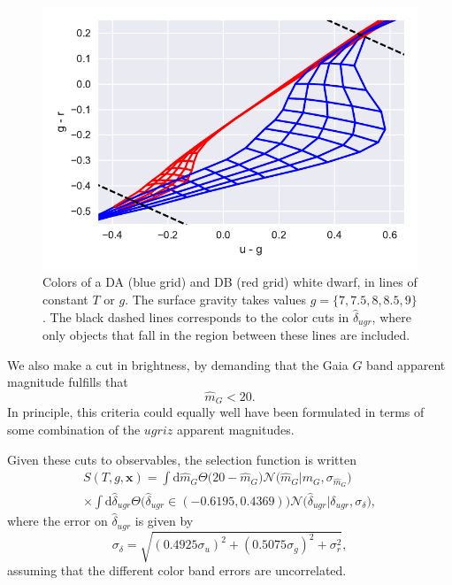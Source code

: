 \documentclass[fleqn,usenatbib]{mnras}
\newcommand{\Teff}{T}
\newcommand{\logg}{g}
\newcommand{\de}{\text{d}}
\begin{document}
\begin{figure}
	\includegraphics[width=\columnwidth]{colors_cut.pdf}
    \caption{Colors of a DA (blue grid) and DB (red grid) white dwarf, in lines of constant $\Teff$ or $\logg$. The surface gravity takes values $\logg = \{7,7.5,8,8.5,9\}$. The black dashed lines corresponds to the color cuts in $\hat{\delta}_{ugr}$, where only objects that fall in the region between these lines are included.}
    \label{fig:colors_cut}
\end{figure}

We also make a cut in brightness, by demanding that the Gaia $G$ band apparent magnitude fulfills that
\begin{equation}
	\hat{m}_G < 20.
\end{equation}
In principle, this criteria could equally well have been formulated in terms of some combination of the $ugriz$ apparent magnitudes.

Given these cuts to observables, the selection function is written
\begin{equation}\label{eq:selection}
\begin{split}
	S(\Teff,\logg,\mathbf{x}) = 
    	      \int \de \hat{m}_G \Theta \big( 20-\hat{m}_G \big)\mathcal{N}\big( \hat{m}_G | m_G,\sigma_{\hat{m}_G} \big) \\
    \times \int \de \hat{\delta}_{ugr} \Theta \big( \hat{\delta}_{ugr} \in (-0.6195,0.4369) \big) \mathcal{N}\big( \hat{\delta}_{ugr} | \delta_{ugr},\sigma_{\delta}\big),
\end{split}
\end{equation}
where the error on $\hat{\delta}_{ugr}$ is given by
\begin{equation}
	\sigma_\delta = \sqrt{ (0.4925 \sigma_u)^2 + (0.5075 \sigma_g)^2 + \sigma_r^2 },
\end{equation}
assuming that the different color band errors are uncorrelated.
\end{document}
